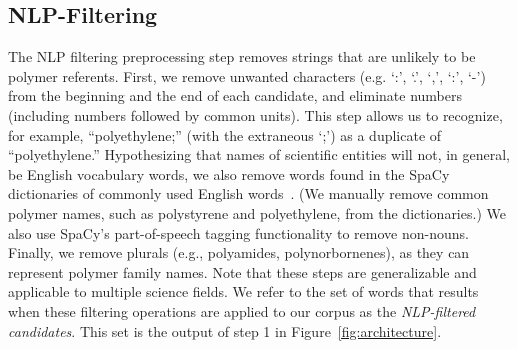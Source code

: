 \subsection{NLP-Filtering}\label{sec:filter}

The NLP filtering preprocessing step removes strings that are unlikely to be polymer referents. 
First, we remove
unwanted characters (e.g. `:', `.', `,', `:', `-') from the beginning and the end of each
candidate, and eliminate numbers (including numbers followed by common units).
This step allows us to recognize, for example, ``polyethylene;'' (with the extraneous `;') 
as a duplicate of ``polyethylene.'' 
Hypothesizing that names of scientific entities will not, in general, be English
vocabulary words, we also remove words found in the SpaCy dictionaries
of commonly used English words~\cite{choi2015depends}. (We manually remove common polymer
names, such as polystyrene and polyethylene, from the dictionaries.) 
We also use
SpaCy's part-of-speech tagging functionality to remove non-nouns.  
Finally, we remove plurals (e.g.,
polyamides, polynorbornenes), as they can represent polymer family names.
Note that these steps are generalizable and applicable to multiple science fields.
We refer to the set of words that results when these filtering operations are applied to our corpus 
as the \emph{NLP-filtered candidates}.
This set is the output of step 1 in Figure~\ref{fig:architecture}.

